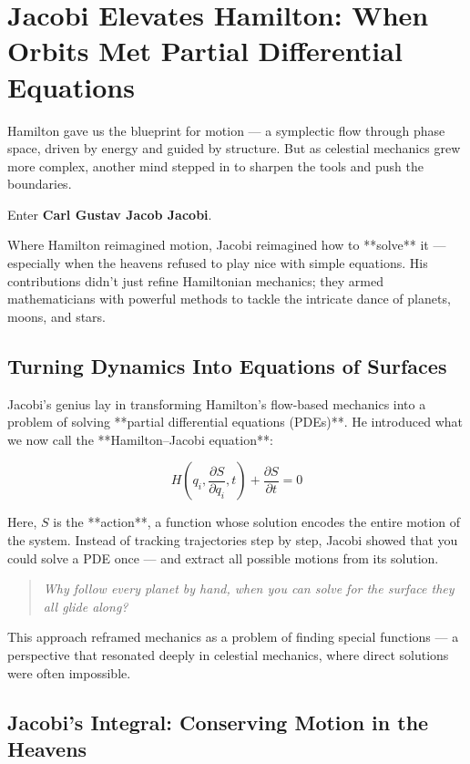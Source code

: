 \section{Jacobi Elevates Hamilton: When Orbits Met Partial Differential Equations}

Hamilton gave us the blueprint for motion — a symplectic flow through phase space, driven by energy and guided by structure. But as celestial mechanics grew more complex, another mind stepped in to sharpen the tools and push the boundaries.

Enter \textbf{Carl Gustav Jacob Jacobi}.

Where Hamilton reimagined motion, Jacobi reimagined how to **solve** it — especially when the heavens refused to play nice with simple equations. His contributions didn’t just refine Hamiltonian mechanics; they armed mathematicians with powerful methods to tackle the intricate dance of planets, moons, and stars.

\subsection{Turning Dynamics Into Equations of Surfaces}

Jacobi’s genius lay in transforming Hamilton’s flow-based mechanics into a problem of solving **partial differential equations (PDEs)**. He introduced what we now call the **Hamilton–Jacobi equation**:

\[
H\left(q_i, \frac{\partial S}{\partial q_i}, t\right) + \frac{\partial S}{\partial t} = 0
\]

Here, \( S \) is the **action**, a function whose solution encodes the entire motion of the system. Instead of tracking trajectories step by step, Jacobi showed that you could solve a PDE once — and extract all possible motions from its solution.

\begin{quote}
\textit{Why follow every planet by hand,  
when you can solve for the surface they all glide along?}
\end{quote}

This approach reframed mechanics as a problem of finding special functions — a perspective that resonated deeply in celestial mechanics, where direct solutions were often impossible.

\subsection{Jacobi’s Integral: Conserving Motion in the Heavens}

